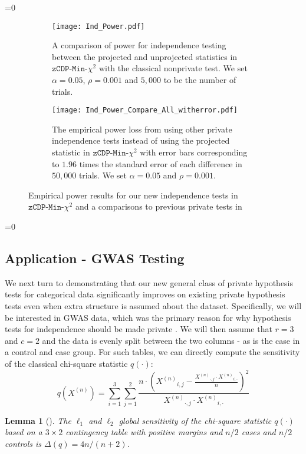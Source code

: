 \documentclass[twoside,letterpaper]{article} \usepackage{aistats2017}
\newtheorem{lemma}[theorem]{Lemma}
\theoremstyle{definition}
\theoremstyle{remark}
\begin{document}
=0
\begin{figure}
\begin{center}
\begin{subfigure}{.45\textwidth}
\begin{flushleft}
\texttt{[image: Ind\_Power.pdf]}
\caption{A comparison of power for independence testing between the projected and unprojected statistics in ${\texttt{zCDP-Min-$\chi^2$}}$ with the classical nonprivate test. We set $\alpha = 0.05$, $\rho = 0.001$ and $5,000$ to be the number of trials. \label{fig:ind_power}}
\end{flushleft}
\end{subfigure}
\hspace{10mm}
\begin{subfigure}{.45\textwidth}
\begin{flushright}
\texttt{[image: Ind\_Power\_Compare\_All\_witherror.pdf]}
\caption{The empirical power loss from using other private independence tests instead of using the projected statistic in ${\texttt{zCDP-Min-$\chi^2$}}$ with error bars corresponding to $1.96$ times the standard error of each difference in $50,000$ trials. We set $\alpha = 0.05$ and $\rho= 0.001$.  \label{fig:power_ind_compare}}
\end{flushright}
\end{subfigure}
\caption{Empirical power results for our new independence tests in ${\texttt{zCDP-Min-$\chi^2$}}$ and a comparisons to previous private tests in \cite{GLRV16} }
\end{center}
\end{figure}
\fi

=0
\subsection{Application - GWAS Testing}
We next turn to demonstrating that our new general class of private hypothesis tests for categorical data significantly improves on existing private hypothesis tests even when extra structure is assumed about the dataset.  Specifically, we will be interested in GWAS data, which was the primary reason for why hypothesis tests for independence should be made private \cite{Homer08}.  We will then assume that $r = 3$ and $c=2$ and the data is evenly split between the two columns - as is the case in a control and case group.  For such tables, we can directly compute the sensitivity of the classical chi-square statistic $q(\cdot)$:
$$
q({X^{({n})}}) = \sum_{i=1}^3 \sum_{j = 1}^2 \frac{ n \cdot \left({X^{({n})}}_{i,j}- \frac{{X^{({n})}}_{\cdot, j} \cdot {X^{({n})}}_{i ,\cdot}}{n} \right)^2}{{X^{({n})}}_{\cdot, j} \cdot {X^{({n})}}_{i ,\cdot} } 
$$
\begin{lemma}[\cite{USF13,YFSU14}]
The $\ell_1$ and $\ell_2$ global sensitivity of the chi-square statistic $q(\cdot)$ based on a $3\times 2$ contingency table with positive margins and $n/2$
cases and $n/2$ controls is $\Delta(q) = 4n/(n+2)$.
\end{lemma}
\end{document}
